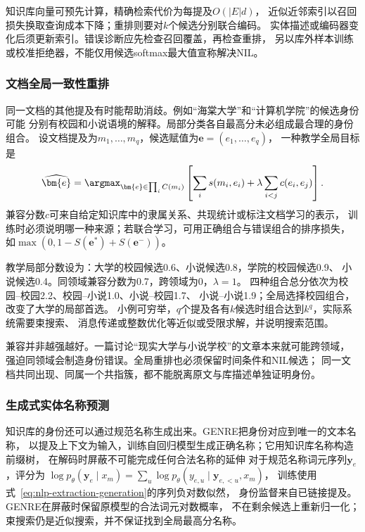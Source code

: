 知识库向量可预先计算，精确检索代价为每提及$O(|E|d)$，
近似近邻索引以召回损失换取查询成本下降；重排则要对$k$个候选分别联合编码。
实体描述或编码器变化后须更新索引。错误诊断应先检查召回覆盖，再检查重排，
另以库外样本训练或校准拒绝器，不能仅用候选softmax最大值宣称解决NIL。

\subsubsection{文档全局一致性重排}
\label{sec:nlp-extraction-global-linking}

同一文档的其他提及有时能帮助消歧。例如“海棠大学”和“计算机学院”的候选身份可能
分别有校园和小说语境的解释。局部分类各自最高分未必组成最合理的身份组合。
设文档提及为$m_1,\ldots,m_q$，候选赋值为$\bm{e}=(e_1,\ldots,e_q)$，
一种教学全局目标是
\begin{equation}
  \widehat{\bm{e}}=\argmax_{\bm{e}\in\prod_i C(m_i)}
  \left[\sum_i s(m_i,e_i)+
  \lambda\sum_{i<j}c(e_i,e_j)\right].
  \label{eq:nlp-extraction-global-linking}
\end{equation}
兼容分数$c$可来自给定知识库中的隶属关系、共现统计或标注文档学习的表示，
训练时必须说明哪一种来源；若联合学习，可用正确组合与错误组合的排序损失，
如$\max(0,1-S(\bm{e}^{*})+S(\bm{e}^{-}))$。

教学局部分数设为：大学的校园候选0.6、小说候选0.8，学院的校园候选0.9、
小说候选0.4。同领域兼容分数为0.7，跨领域为0，$\lambda=1$。
四种组合总分依次为校园--校园2.2、校园--小说1.0、小说--校园1.7、
小说--小说1.9；全局选择校园组合，改变了大学的局部首选。
小例可穷举，$q$个提及各有$k$候选时组合达到$k^q$，实际系统需要束搜索、
消息传递或整数优化等近似或受限求解，并说明搜索范围。

兼容并非越强越好。一篇讨论“现实大学与小说学校”的文章本来就可能跨领域，
强迫同领域会制造身份错误。全局重排也必须保留时间条件和NIL候选；
同一文档共同出现、同属一个共指簇，都不能脱离原文与库描述单独证明身份。

\subsubsection{生成式实体名称预测}
\label{sec:nlp-extraction-generative-linking}

知识库的身份还可以通过规范名称生成出来。GENRE把身份对应到唯一的文本名称，
以提及上下文为输入，训练自回归模型生成正确名称；它用知识库名称构造前缀树，
在解码时屏蔽不可能完成任何合法名称的延伸
对于规范名称词元序列$\bm{y}_e$，评分为
$\log p_\theta(\bm{y}_e\mid x_m)=\sum_u\log p_\theta(y_{e,u}\mid\bm{y}_{e,<u},x_m)$，
训练使用式~\eqref{eq:nlp-extraction-generation}的序列负对数似然，
身份监督来自已链接提及。GENRE在屏蔽时保留原模型的合法词元对数概率，
不在剩余候选上重新归一化；束搜索仍是近似搜索，并不保证找到全局最高分名称。

